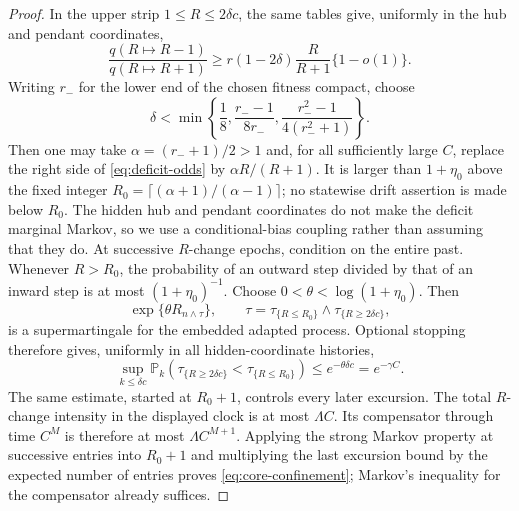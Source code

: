 \documentclass[11pt]{article}
\theoremstyle{definition}
\theoremstyle{remark}
\newcommand{\Prob}{\mathbb P}
\begin{document}
\begin{proof}
In the upper strip $1\leq R\leq2\delta c$, the same tables give, uniformly
in the hub and pendant coordinates,
\begin{equation}
 \frac{q(R\mapsto R-1)}{q(R\mapsto R+1)}
 \geq r(1-2\delta)\frac{R}{R+1}\{1-o(1)\}.
\label{eq:deficit-odds}
\end{equation}
Writing $r_-$ for the lower end of the chosen fitness compact, choose
\[
 \delta<\min\left\{\frac18,\frac{r_--1}{8r_-},
 \frac{r_-^2-1}{4(r_-^2+1)}\right\}.
\]
Then one may take $\alpha=(r_-+1)/2>1$ and, for all sufficiently large
$C$, replace the right side of \eqref{eq:deficit-odds} by
$\alpha R/(R+1)$.  It is larger than $1+\eta_0$ above the fixed integer
$R_0=\lceil(\alpha+1)/(\alpha-1)\rceil$; no statewise drift assertion is
made below $R_0$.  The hidden hub and pendant coordinates do not make the
deficit marginal Markov, so we use a conditional-bias coupling rather than
assuming that they do.  At successive $R$-change epochs, condition on the
entire past.  Whenever $R>R_0$, the probability of an outward step divided
by that of an inward step is at most $(1+\eta_0)^{-1}$.  Choose
$0<\theta<\log(1+\eta_0)$.  Then
\[
 \exp\{\theta R_{n\wedge\tau}\},\qquad
 \tau=\tau_{\{R\leq R_0\}}\wedge\tau_{\{R\geq2\delta c\}},
\]
is a supermartingale for the embedded adapted process.  Optional stopping
therefore gives, uniformly in all hidden-coordinate histories,
\begin{equation}
 \sup_{k\leq\delta c}
 \Prob_k(\tau_{\{R\geq2\delta c\}}<\tau_{\{R\leq R_0\}})
 \leq e^{-\theta\delta c}=e^{-\gamma C}.
\label{eq:deficit-initial-excursion}
\end{equation}
The same estimate, started at $R_0+1$, controls every later excursion.
The total $R$-change intensity in the displayed clock is at most $\Lambda C$.
Its compensator through time $C^M$ is therefore at most
$\Lambda C^{M+1}$.  Applying the strong Markov property at successive
entries into $R_0+1$ and multiplying the last excursion bound by the expected
number of entries proves \eqref{eq:core-confinement}; Markov's inequality for
the compensator already suffices.


\end{proof}
\end{document}
